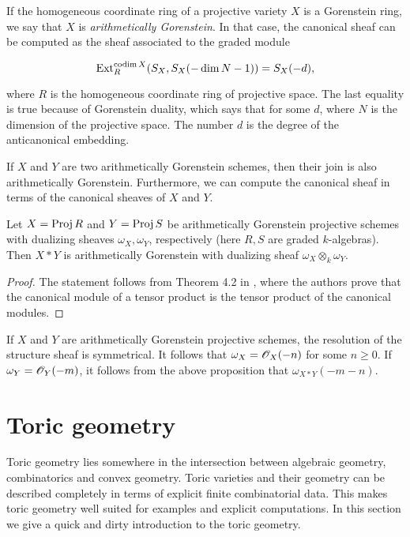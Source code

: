 If the homogeneous coordinate ring of a projective variety $X$ is a Gorenstein ring, we say that $X$ is \emph{arithmetically Gorenstein}. In that case, the canonical sheaf can be computed as the sheaf associated to the graded module

$$\operatorname{Ext}_R^{\operatorname{codim} X}(S_X,S_X(-\dim N-1))=S_X(-d),$$

where $R$ is the homogeneous coordinate ring of projective space. The last equality is true  because of Gorenstein duality, which says that for some $d$, where $N$ is the dimension of the projective space. The number $d$ is the degree of the anticanonical embedding. %

If $X$ and $Y$ are two arithmetically Gorenstein schemes, then their join is also arithmetically Gorenstein. Furthermore, we can compute the canonical sheaf in terms of the canonical sheaves of $X$ and $Y$.

\begin{proposition}
Let $X=\operatorname{Proj} R$ and $Y=\operatorname{Proj} S$ be arithmetically Gorenstein projective schemes with dualizing sheaves $\omega_X, \omega_Y$, respectively (here $R, S$ are graded $k$-algebras). Then $X \ast Y$ is arithmetically Gorenstein with dualizing sheaf $\omega_X \otimes_k \omega_Y$.
\end{proposition}

\begin{proof}
The statement follows from Theorem 4.2 in \cite{herzog_canonical}, where the authors prove that the canonical module of a tensor product is the tensor product of the canonical modules.
\end{proof}

\begin{remark}
\label{remark:canonical}
If $X$ and $Y$ are arithmetically Gorenstein projective schemes, the resolution of the structure sheaf is symmetrical. It follows that $\omega_X=\mathscr{O}_X(-n)$ for some $n \geq 0$. If $\omega_Y=\mathscr{O}_Y(-m)$, it follows from the above proposition that $\omega_{X \ast Y}(-m-n)$.
\end{remark}

\section{Toric geometry}
\label{sec:toric_geometry}

Toric geometry lies somewhere in the intersection between algebraic geometry, combinatorics and convex geometry. Toric varieties and their geometry can be described completely in terms of explicit finite combinatorial data. This makes toric geometry well suited for examples and explicit computations. In this section we give a quick and dirty introduction to the toric geometry.

